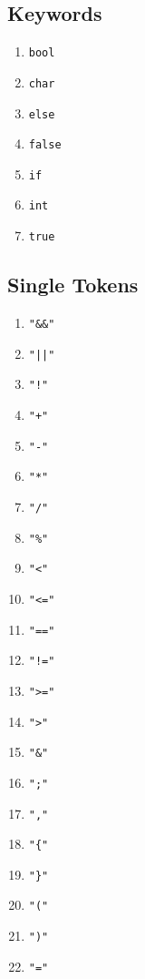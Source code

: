 \documentclass[11pt]{report}
\begin{document}
\subsection{Keywords}
\begin{multicols}{3}
\begin{enumerate}
	\item \verb$bool$
	\item \verb$char$
	\item \verb$else$
	\item \verb$false$
	\item \verb$if$
	\item \verb$int$
	\item \verb$true$
\end{enumerate}
\end{multicols}

\subsection{Single Tokens}
\begin{multicols}{4}
\begin{enumerate}
	\item \verb$"&&"$
	\item \verb$"||"$
	\item \verb$"!"$
	\item \verb$"+"$
	\item \verb$"-"$
	\item \verb$"*"$
	\item \verb$"/"$
	\item \verb$"%"$
	\item \verb$"<"$
	\item \verb$"<="$
	\item \verb$"=="$
	\item \verb$"!="$
	\item \verb$">="$
	\item \verb$">"$
	\item \verb$"&"$
	\item \verb$";"$
	\item \verb$","$
	\item \verb$"{"$
	\item \verb$"}"$
	\item \verb$"("$
	\item \verb$")"$
	\item \verb$"="$
\end{enumerate}
\end{multicols}
\end{document}
